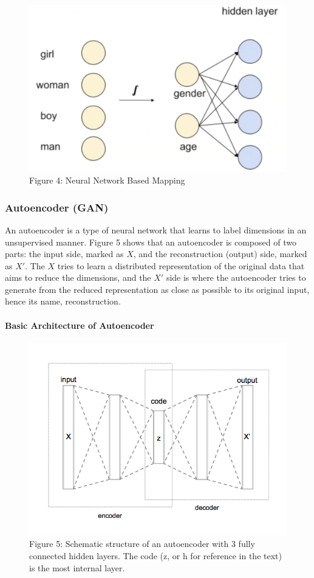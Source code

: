 \documentclass[paper=a4, fontsize=12pt]{scrartcl}
\begin{document}
\begin{figure}
  \includegraphics[width=\linewidth]{nnlm.png}
  \caption{Figure 4: Neural Network Based Mapping}
  \label{fig:nnlm}
\end{figure}
\subsubsection{Autoencoder (GAN)}
An autoencoder is a type of neural network that learns to label dimensions in an unsupervised manner. Figure 5 shows that an autoencoder is composed of two parts: the input side, marked as $X$, and the reconstruction (output) side, marked as $X'$. The $X$ tries to learn a distributed representation of the original data that aims to reduce the dimensions, and the $X'$ side is where the autoencoder tries to generate from the reduced representation as close as possible to its original input, hence its name, reconstruction. 
\paragraph{Basic Architecture of Autoencoder}
\begin{figure}
  \includegraphics[width=\linewidth]{Autoencoder_structure.png}
  \caption{Figure 5: Schematic structure of an autoencoder with 3 fully connected hidden layers. The code (z, or h for reference in the text) is the most internal layer.}
  \label{fig:autoencoder}
\end{figure}
\end{document}
